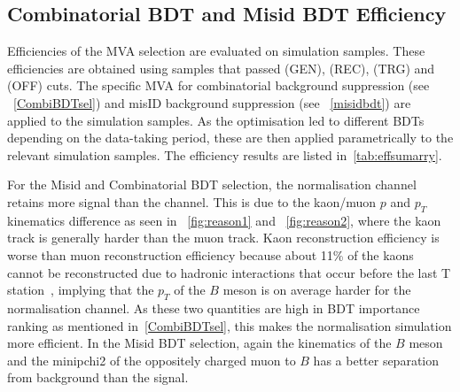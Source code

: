 \subsection{Combinatorial BDT and Misid BDT Efficiency}
 Efficiencies of the MVA selection are evaluated on simulation samples. These efficiencies are obtained using samples that passed (GEN), (REC), (TRG) and (OFF) cuts. The specific MVA for combinatorial background suppression (see ~\autoref{CombiBDTsel}) and misID background suppression (see ~\autoref{misidbdt}) are applied to the simulation samples. As the optimisation led to different BDTs depending on the data-taking period, these are then applied parametrically to the relevant simulation samples. The efficiency results are listed in~\autoref{tab:effsumarry}.

For the Misid and Combinatorial BDT selection, the normalisation \bjpsimumuk channel retains more signal than the \Bmumumu channel. This is due to the kaon/muon $p$ and $p_{T}$ kinematics difference as seen in ~\autoref{fig:reason1} and ~\autoref{fig:reason2}, where the kaon track is generally harder than the muon track. Kaon reconstruction efficiency is worse than muon reconstruction efficiency because about 11\% of the kaons cannot be reconstructed due to hadronic interactions that occur before the last T station~\cite{LHCb-DP-2013-002}, implying that the $p_{T}$ of the $B$ meson is on average harder for the normalisation channel. As these two quantities are high in BDT importance ranking as mentioned in~\autoref{CombiBDTsel}, this makes  the normalisation simulation more efficient. In the Misid BDT selection, again the kinematics of the $B$ meson and the \gls{minipchi2} of the oppositely charged muon to $B$ has a better separation from background than the signal.



